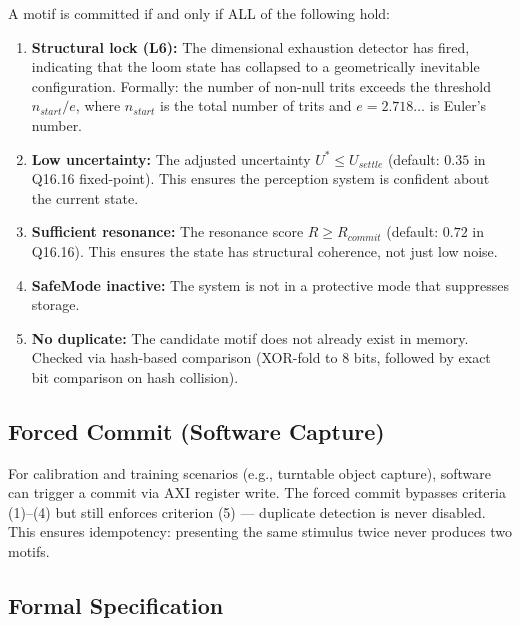 \documentclass[11pt, a4paper]{article}
\begin{document}
A motif is committed if and only if ALL of the following hold:

\begin{enumerate}[nosep]
  \item \textbf{Structural lock (L6):} The dimensional exhaustion
        detector has fired, indicating that the loom state has
        collapsed to a geometrically inevitable configuration.
        Formally: the number of non-null trits exceeds the
        threshold $n_{start}/e$, where $n_{start}$ is the total
        number of trits and $e = 2.718\ldots$ is Euler's number.

  \item \textbf{Low uncertainty:} The adjusted uncertainty
        $U^* \leq U_{settle}$ (default: $0.35$ in Q16.16
        fixed-point). This ensures the perception system is
        confident about the current state.

  \item \textbf{Sufficient resonance:} The resonance score
        $R \geq R_{commit}$ (default: $0.72$ in Q16.16).
        This ensures the state has structural coherence, not
        just low noise.

  \item \textbf{SafeMode inactive:} The system is not in a
        protective mode that suppresses storage.

  \item \textbf{No duplicate:} The candidate motif does not
        already exist in memory. Checked via hash-based
        comparison (XOR-fold to 8 bits, followed by exact
        bit comparison on hash collision).
\end{enumerate}

\subsection{Forced Commit (Software Capture)}

For calibration and training scenarios (e.g., turntable object
capture), software can trigger a commit via AXI register write.
The forced commit bypasses criteria (1)--(4) but still enforces
criterion (5) --- duplicate detection is never disabled. This
ensures idempotency: presenting the same stimulus twice never
produces two motifs.

\subsection{Formal Specification}
\end{document}
